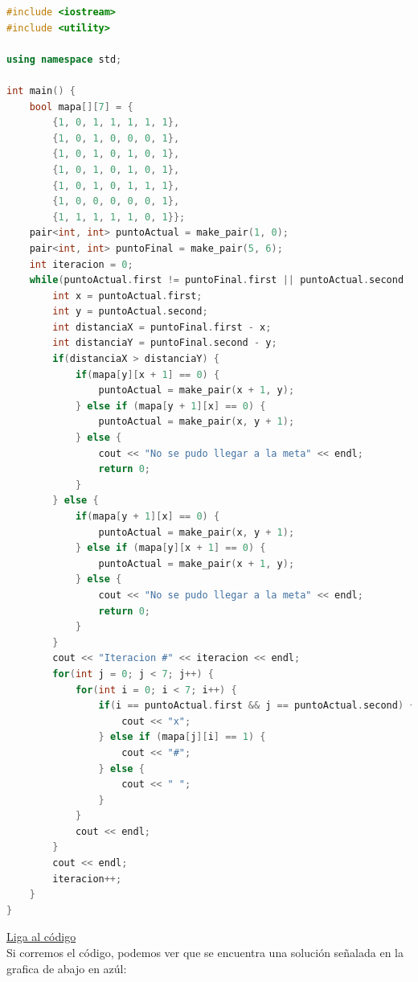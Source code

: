 \documentclass{article}
\begin{document}
\begin{lstlisting}[language=C++, title=Camino greedy]
#include <iostream>
#include <utility>

using namespace std;

int main() {
	bool mapa[][7] = {
		{1, 0, 1, 1, 1, 1, 1},
		{1, 0, 1, 0, 0, 0, 1},
		{1, 0, 1, 0, 1, 0, 1},
		{1, 0, 1, 0, 1, 0, 1},
		{1, 0, 1, 0, 1, 1, 1},
		{1, 0, 0, 0, 0, 0, 1},
		{1, 1, 1, 1, 1, 0, 1}};
	pair<int, int> puntoActual = make_pair(1, 0);
	pair<int, int> puntoFinal = make_pair(5, 6);
	int iteracion = 0;
	while(puntoActual.first != puntoFinal.first || puntoActual.second != puntoFinal.second) {
		int x = puntoActual.first;
		int y = puntoActual.second;
		int distanciaX = puntoFinal.first - x;
		int distanciaY = puntoFinal.second - y;
		if(distanciaX > distanciaY) {
			if(mapa[y][x + 1] == 0) {
				puntoActual = make_pair(x + 1, y);
			} else if (mapa[y + 1][x] == 0) {
				puntoActual = make_pair(x, y + 1);
			} else {
				cout << "No se pudo llegar a la meta" << endl;
				return 0;
			}
		} else {
			if(mapa[y + 1][x] == 0) {
				puntoActual = make_pair(x, y + 1);
			} else if (mapa[y][x + 1] == 0) {
				puntoActual = make_pair(x + 1, y);
			} else {
				cout << "No se pudo llegar a la meta" << endl;
				return 0;
			}
		}
		cout << "Iteracion #" << iteracion << endl;
		for(int j = 0; j < 7; j++) {
			for(int i = 0; i < 7; i++) {
				if(i == puntoActual.first && j == puntoActual.second) {
					cout << "x";
				} else if (mapa[j][i] == 1) {
					cout << "#";
				} else {
					cout << " ";
				}
			}
			cout << endl;
		}
		cout << endl;
		iteracion++;
	}
}
\end{lstlisting}
\href{https://repl.it/@Jamesscn/Algoritmos-Greedy}{Liga al código} \\

Si corremos el código, podemos ver que se encuentra una solución señalada en la grafica de abajo en azúl:
\end{document}
